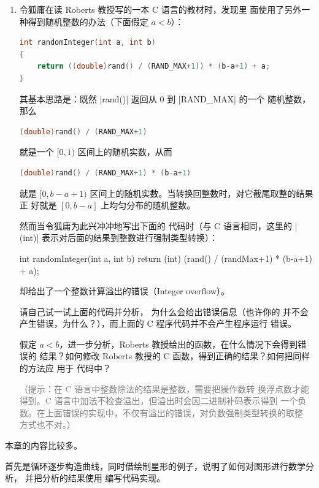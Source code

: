 \begin{enumerate}
  \item\label{ex:randint} 令狐庸在读 Roberts 教授写的一本 C 语言的教材时，发现里
    面使用了另外一种得到随机整数的办法（下面假定 $a<b$）：
\begin{lstlisting}[language=C,backgroundcolor={\color{green!20!lightgray}}]
int randomInteger(int a, int b)
{
    return ((double)rand() / (RAND_MAX+1)) * (b-a+1) + a;
}
\end{lstlisting}
    其基本思路是：既然 \cinline|rand()| 返回从 0 到 \cinline|RAND_MAX| 的一个
    随机整数，那么
\begin{lstlisting}[language=C,backgroundcolor={\color{green!20!lightgray}}]
(double)rand() / (RAND_MAX+1)
\end{lstlisting}
    就是一个 $[0,1)$ 区间上的随机实数，从而
\begin{lstlisting}[language=C,backgroundcolor={\color{green!20!lightgray}}]
(double)rand() / (RAND_MAX+1) * (b-a+1)
\end{lstlisting}
    就是 $[0, b-a+1)$ 区间上的随机实数。当转换回整数时，对它截尾取整的结果正
    好就是 $[0,b-a]$ 上均匀分布的随机整数。

    然而当令狐庸为此兴冲冲地写出下面的 \Asy{} 代码时（与 C 语言相同，这里的
    |(int)| 表示对后面的结果到整数进行强制类型转换）：
\begin{asycode}
int randomInteger(int a, int b)
{
    return (int) (rand() / (randMax+1) * (b-a+1) + a);
}
\end{asycode}
    \Asy{} 却给出了一个整数计算溢出的错误（Integer overflow）。

    请自己试一试上面的代码并分析，\Asy{} 为什么会给出错误信息（也许你的
    \Asy{} 并不会产生错误，为什么？），而上面的 C 程序代码并不会产生程序运行
    错误。

    假定 $a<b$，进一步分析，Roberts 教授给出的函数，在什么情况下会得到错误的
    结果？如何修改 Roberts 教授的 C 函数，得到正确的结果？如何把同样的方法应
    用于 \Asy{} 代码中？

    \textcolor{gray}{（提示：在 C 语言中整数除法的结果是整数，需要把操作数转
    换浮点数才能得到。C 语言中加法不检查溢出，但溢出时会因二进制补码表示得到
    一个负数。在上面错误的实现中，不仅有溢出的错误，对负数强制类型转换的取整
    方式也不对。）}

\end{enumerate}%

本章的内容比较多。

首先是循环逐步构造曲线，同时借绘制星形的例子，说明了如何对图形进行数学分析，
并把分析的结果使用 \Asy{} 编写代码实现。

